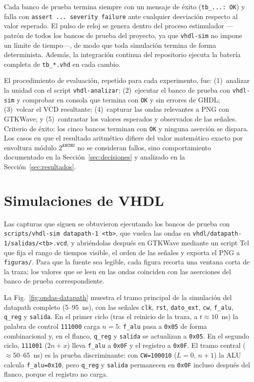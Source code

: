 \documentclass[llncs]{llncs}
\begin{document}
Cada banco de prueba termina siempre con un mensaje de éxito
(\texttt{tb\_...: OK}) y falla con \texttt{assert ... severity failure}
ante cualquier desviación respecto al valor esperado. El pulso de reloj se
genera dentro del proceso estimulador ---patrón de todos los bancos de
prueba del proyecto, ya que \texttt{vhdl-sim} no impone un límite
de tiempo---, de modo que toda simulación termina de forma
determinista. Además, la integración continua del repositorio ejecuta la
batería completa de \texttt{tb\_*.vhd} en cada cambio.

El procedimiento de evaluación, repetido para cada experimento, fue:
(1)~analizar la unidad con el script \texttt{vhdl-analizar};
(2)~ejecutar el banco de prueba con \texttt{vhdl-sim} y comprobar en
consola que termina con \texttt{OK} y sin errores de GHDL;
(3)~volcar el VCD resultante;
(4)~capturar las ondas relevantes a PNG con GTKWave; y (5)~contrastar los
valores esperados y observados de las señales. Criterio de éxito: los
cinco bancos terminan con \texttt{OK} y ninguna aserción se dispara. Los
casos en que el resultado aritmético difiere del valor matemático exacto
por envoltura módulo $2^{\texttt{ANCHO}}$ no se consideran fallos, sino
comportamiento documentado en la Sección~\ref{sec:decisiones} y analizado
en la Sección~\ref{sec:resultados}.

\section{Simulaciones de VHDL}
\label{sec:simulaciones}

Las capturas que siguen se obtuvieron ejecutando los bancos de prueba con
\texttt{scripts/vhdl-sim datapath-1 <tb>}, que vuelca las ondas en
\texttt{vhdl/datapath-1/salidas/<tb>.vcd}, y abriéndolas después en GTKWave
mediante un script Tcl que fija el rango de tiempos visible, el orden de las
señales y exporta el PNG a \texttt{figuras/}. Para que la fuente sea
legible, cada figura recorta una ventana corta de la traza; los valores que
se leen en las ondas coinciden con las aserciones del banco de prueba
correspondiente.

La Fig.~\ref{fig:ondas-datapath} muestra el tramo principal de la
simulación del datapath completo (5--95~ns), con las señales \texttt{clk},
\texttt{rst}, \texttt{dato\_ext}, \texttt{cw}, \texttt{f\_alu},
\texttt{q\_reg} y \texttt{salida}. En el primer ciclo (tras el reinicio de
la traza, a $t\approx 10$~ns) la palabra de control \texttt{111000} carga
$n=5$: \texttt{f\_alu} pasa a \texttt{0x05} de forma combinacional y, en el
flanco, \texttt{q\_reg} y \texttt{salida} se actualizan a \texttt{0x05}.
En el segundo ciclo, \texttt{111001} ($2n+x$) lleva \texttt{f\_alu} a
\texttt{0x0F} y el registro a \texttt{0x0F}. El tramo central
($\approx$50--65~ns) es la prueba discriminante: con \texttt{CW=100010}
($L=0$, $n+1$) la ALU calcula \texttt{f\_alu=0x10}, pero \texttt{q\_reg} y
\texttt{salida} permanecen en \texttt{0x0F} incluso después del flanco,
porque el registro no carga.
\end{document}
